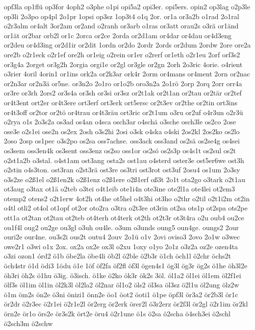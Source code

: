 {opf3la
op1flü
op3for
4oph2
o3phe
o1pi
opi5a2
opi3er.
opi5ers.
opin2
op3lag
o2p3le
op3li
2o3po
op4pl
2o1pr
1opsi
op3sz
1op3t4
o1q
2or.
or1a
or3a2b
o1rad
2o1ral
o2r3alm
or4alt
3or2am
or2and
o2ranh
or3arb
o1ras
or3att
orau2s
o3rä
or1änd
or1ät
or2bar
orb2l
or1c
2orca
or2ce
2orda
or2d1am
or4dar
or4dau
or4d3eng
or2deu
or4d3ing
or2d1ir
or2dit
1ordn
or2do
2ordr
2ords
or2dum
2ordw
2ore
ore2a
ore2b
o2r1eck
o2r1ef
ore2h
or1eig
o2rein
or1er
o2rerf
or1eth
o2r1eu
2orf
orf3s2
or3g4a
2orget
or3g2h
2orgia
orgi1e
or2gl
or3gle
or2gn
2orh
2o3ric
4orie.
o4rient
o3rier
4oril
4orin1
or1ins
ork2a
or2k3ar
ork4r
2orm
or4mans
or4ment
2orn
or2nac
or2n3ar
or2n3ä
or5ne.
or3n2o
2o1ro
or1o2b
oro3n2a
2o1rö
2orp
2orq
2orr
orr4a
or3re
or3rh
2ors2
or3s4a
or3sh
or3si
or3sz
or2t1ak
or2t1an
or2tau
or2tär
or2tef
or4t3ent
ort2er
or4t3ere
ort3erf
ort3erk
ort5ersc
or2t3ev
or2the
or2tin
ort3ins
or4t3off
or2tor
or2tö
or4trau
or4t3räu
ort3ric
or2t1um
o3ru
or2uf
o4r3un
o2r3ü
o2rya
o1s
2o3s2a
os3ad
os4an
o4sca
osch3ar
o4schä
o3sche
osch3le
os2co
2ose
ose3e
o2s1ei
ose2n
os2ex
2osh
o3s2hi
2osi
o3sk
o4ska
o4ski
2os2kl
2os2ko
os2lo
2oso
2osp
os1pec
o3s2po
os2sa
oss7achse.
oss3ack
oss3and
os2sä
os2se4g
os4sei
os3sem
oss3en4k
os3sent
oss3enz
os2so
oss1or
os2sö
os2s3p
os4s1t
os2sul
os2t
o2st1a2b
o3stal.
o4st1am
ost3ang
osta2s
ost1au
o4sterd
oster3e
ost5er6we
ost3h
o2stin
o4s3ton.
ost3ran
o2st3rä
ost3re
os3tri
ost3rot
ost3uf
2osu4
os1um
2o3sy
o3s2ze
o2ß1el
o2ß1en2k
o2ß1enz
o2ß1ere
o2ß1erf
oß3t
2o1t
ota2go
o3tark
o2t1au
ot3aug
o3tax
ot1ä
o2teb
o3tei
o4t1eib
ote1i4n
ote3ine
ote2l1a
ote4lei
ot2em3
otemp2
otens2
o2t1erw
4ot2h
ot4he
ot5hel
o4t3hi
ot3ho
o2thr
o2til
o2t1i2m
ot2in
o4tl
otli2
ot4ol
ot1opf
ot2or
oto2ra
o3tra
o2t3re
ot3rin
ot2sa
ots1p
ot2spa
ots2pe
ott1a
ot2tan
ot2tau
ot2teb
ot4terh
ot4terk
ot2th
ot2t3r
ot3t4ra
o2u
oub4
ou2ce
ou1f4l
oug2
ou2ge
ou3gl
o3uh
ou4le.
o3um
o3unds
oung5
oun4ge.
oungs2
2our
ouri2e
our4ne.
ou3s2i
ous2t
outu4
2ouv
2o1ü
o1v
2ovi
oviso3
2ovo
2o1w
o3wec
owe2r1
o3wi
o1x
2ox.
ox2a
ox2e
ox3l
o2xu
1oxy
o1yo
2o1z
o3z2a
oz2e
ozen4ta
o3zi
ozon1
órd2
ö1b
öbe2la
öbe4li
öb2l
ö2ble
ö2b3r
ö1ch
öch1l
ö2chr
öchs2t
öch4str
ö1d
ödi3
1ödu
ö1e
1öf
öf2fa
öf2fl
öf3l
ögen4s1
ög3l
ög3r
ög2s
ö1he
öh3l2e
öh3ri
öh2s
ö1hu
ö3ig.
ö3isch.
ö1ke
ö2ko
ök3r
ök2s
3öl.
öl1a2
öl1ei
öl1em
öl2f1ei
ölf3s
öl1im
öl1in
öl2k3l
öl2la2
öl2nar
öl1o2
öls2
öl3sa
öl3sz
ö2l1u
öl2ung
ölz2w
ö1m
öm2s
ön2e
ö3ni
önizi1
önn2e
öo1
öot2
öoti1
ö1pe
öpf3l
ör3a2
ör2b3l
ör1c
ör2dr
ö2r3ec
ö2r1ei
ö2r1e2l
ör2erg
ör2erk
örer2l
ö3r2erz
ör2f3l
ör2gl
ö2r1im
ör2kl
örn2e
ör1o
örs2e
ör3s2k
ört2e
öru4
ö2r1une
ö1s
ö2sa
ö2scha
ö4sch3ei
ö2schl
ö2sch3m
ö2schw
}

